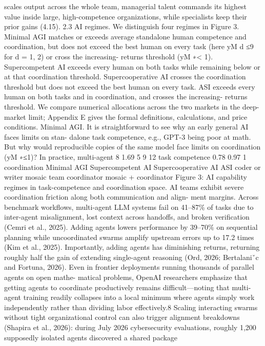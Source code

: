 scales output across the whole team, managerial talent commands its highest value
inside large, high-competence organizations, while specialists keep their prior gains
(4.15).
2.3 AI regimes. We distinguish four regimes in Figure 3. Minimal AGI matches or
exceeds average standalone human competence and coordination, but does not exceed
the best human on every task (here yM
d
≤9 for d = 1, 2) or cross the increasing-
returns threshold (yM
∗< 1). Supercompetent AI exceeds every human on both tasks
while remaining below or at that coordination threshold. Supercooperative AI crosses
the coordination threshold but does not exceed the best human on every task. ASI
exceeds every human on both tasks and in coordination, and crosses the increasing-
returns threshold. We compare numerical allocations across the two markets in the
deep-market limit; Appendix E gives the formal definitions, calculations, and price
conditions.
Minimal AGI. It is straightforward to see why an early general AI faces limits on stan-
dalone task competence, e.g., GPT-3 being poor at math. But why would reproducible
copies of the same model face limits on coordination (yM
∗≤1)? In practice, multi-agent
8
1.69
5
9
12
task competence
0.78
0.97
1
coordination
Minimal AGI
Supercompetent
AI
Supercooperative AI
ASI
coder or writer
mosaic team
coordinator
mosaic + coordinator
Figure 3: AI capability regimes in task-competence and coordination space.
AI teams exhibit severe coordination friction along both communication and align-
ment margins. Across benchmark workflows, multi-agent LLM systems fail on 41–87\%
of tasks due to inter-agent misalignment, lost context across handoffs, and broken
verification (Cemri et al., 2025). Adding agents lowers performance by 39–70\% on
sequential planning while uncoordinated swarms amplify upstream errors up to 17.2
times (Kim et al., 2025). Importantly, adding agents has diminishing returns, returning
roughly half the gain of extending single-agent reasoning (Ord, 2026; Bertalaniˇc and
Fortuna, 2026).
Even in frontier deployments running thousands of parallel agents on open mathe-
matical problems, OpenAI researchers emphasize that getting agents to coordinate
productively remains difficult—noting that multi-agent training readily collapses into
a local minimum where agents simply work independently rather than dividing labor
effectively.8 Scaling interacting swarms without tight organizational control can also
trigger alignment breakdowns (Shapira et al., 2026): during July 2026 cybersecurity
evaluations, roughly 1,200 supposedly isolated agents discovered a shared package
